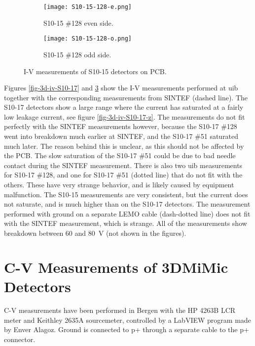 \documentclass[../main/thesis.tex]{subfiles}
\begin{document}
\begin{figure}
	\centering
	\begin{subfigure}{.5\textwidth}
		\centering
		\texttt{[image: S10-15-128-e.png]}
		\caption{S10-15 \#128 even side.}
		\label{fig-S10-15-128-e}
	\end{subfigure}%
	\begin{subfigure}{.5\textwidth}
		\centering
		\texttt{[image: S10-15-128-o.png]}
		\caption{S10-15 \#128 odd side.}
		\label{fig-S10-15-128-o}
	\end{subfigure}
	\caption{I-V measurements of S10-15 detectors on PCB.}
	\label{fig-3d-iv-S10-15}
\end{figure}

Figures \ref{fig-3d-iv-S10-17} and \ref{fig-3d-iv-S10-15} show the I-V measurements performed at \gls{uib} together with the corresponding measurements from SINTEF (dashed line). The S10-17 detectors show a large range where the current has saturated at a fairly low leakage current, see figure \ref{fig-3d-iv-S10-17-z}. The measurements do not fit perfectly with the SINTEF measurements however, because the S10-17 \#128 went into breakdown much earlier at SINTEF, and the S10-17 \#51 saturated much later. The reason behind this is unclear, as this should not be affected by the \gls{PCB}. The slow saturation of the S10-17 \#51 could be due to bad needle contact during the SINTEF measurement. There is also two \gls{uib} measurements for S10-17 \#128, and one for S10-17 \#51 (dotted line) that do not fit with the others. These have very strange behavior, and is likely caused by equipment malfunction. The S10-15 measurements are very consistent, but the current does not saturate, and is much higher than on the S10-17 detectors. The measurement performed with ground on a separate LEMO cable (dash-dotted line) does not fit with the SINTEF measurement, which is strange. All of the measurements show breakdown between 60 and 80~V (not shown in the figures). 


\section{C-V Measurements of 3DMiMic Detectors}

C-V measurements have been performed in Bergen with the HP 4263B LCR meter and Keithley 2635A sourcemeter, controlled by a LabVIEW program made by Enver Alagoz. Ground is connected to p+ through a separate cable to the p+ connector. 
\end{document}
